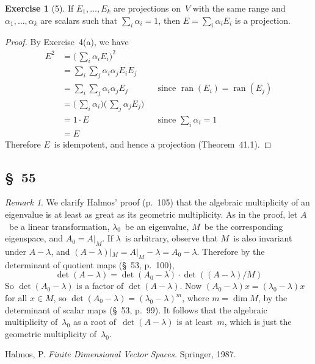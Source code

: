 \documentclass[letterpaper,12pt]{article}
\DeclareMathOperator{\ran}{ran}
\newcommand{\restrict}[2]{{#1}|_{#2}}
\theoremstyle{definition}
\newtheorem*{exer}{Exercise}
\theoremstyle{remark}
\newtheorem*{rmk}{Remark}
\theoremstyle{direction}
\begin{document}
\begin{exer}[5]
If \(E_1,\ldots,E_k\) are projections on~\(V\) with the same range and \(\alpha_1,\ldots,\alpha_k\) are scalars such that \(\sum_i\alpha_i=1\), then \(E=\sum_i\alpha_i E_i\) is a projection.
\end{exer}
\begin{proof}
By Exercise~4(a), we have
\begin{align*}
E^2&=\bigl(\,\sum_i\alpha_iE_i\bigr)^2&&\\
	&=\sum_i\sum_j\alpha_i\alpha_j E_iE_j&&\\
	&=\sum_i\sum_j\alpha_i\alpha_j E_j&&\text{since \(\ran(E_i)=\ran(E_j)\)}\\
	&=\bigl(\,\sum_i\alpha_i\bigr)\bigl(\,\sum_j\alpha_jE_j\bigr)&&\\
	&=1\cdot E&&\text{since \(\textstyle\sum_i\alpha_i=1\)}\\
	&=E
\end{align*}
Therefore \(E\)~is idempotent, and hence a projection (Theorem~41.1).
\end{proof}

\subsection*{\S~55}
\begin{rmk}
We clarify Halmos' proof (p.~105) that the algebraic multiplicity of an eigenvalue is at least as great as its geometric multiplicity. As in the proof, let \(A\)~be a linear transformation, \(\lambda_0\)~be an eigenvalue, \(M\)~be the corresponding eigenspace, and \(A_0=\restrict{A}{M}\). If \(\lambda\)~is arbitrary, observe that \(M\)~is also invariant under \(A-\lambda\), and \(\restrict{(A-\lambda)}{M}=\restrict{A}{M}-\lambda=A_0-\lambda\). Therefore by the determinant of quotient maps (\S~53, p.~100),
\[\det(A-\lambda)=\det(A_0-\lambda)\cdot\det((A-\lambda)/M)\]
So \(\det(A_0-\lambda)\) is a factor of \(\det(A-\lambda)\). Now \((A_0-\lambda)x=(\lambda_0-\lambda)x\) for all \(x\in M\), so \(\det(A_0-\lambda)=(\lambda_0-\lambda)^m\), where \(m=\dim M\), by the determinant of scalar maps (\S~53, p.~99). It follows that the algebraic multiplicity of~\(\lambda_0\) as a root of~\(\det(A-\lambda)\) is at least~\(m\), which is just the geometric multiplicity of~\(\lambda_0\).
\end{rmk}

\begin{thebibliography}{0}
 Halmos, P. \textit{Finite Dimensional Vector Spaces.} Springer, 1987.
\end{thebibliography}
\end{document}
